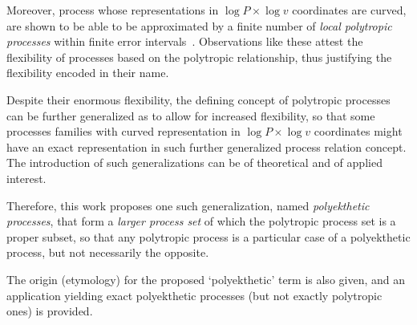     Moreover, process whose representations in $\log P \times \log v$  coordinates  are  curved,
    are shown to be able to be  approximated  by  a  finite  number  of  \emph{local  polytropic
    processes} within  finite  error  intervals~\cite{2020-NaaktgeborenC-engrXiv}.  Observations
    like these attest the flexibility of processes based on the  polytropic  relationship,  thus
    justifying the flexibility encoded in their name.

    Despite their enormous flexibility, the defining concept  of  polytropic  processes  can  be
    further generalized as to allow for increased flexibility, so that some  processes  families
    with curved representation in $\log P  \times  \log  v$  coordinates  might  have  an  exact
    representation in such further generalized process relation  concept.  The  introduction  of
    such generalizations can be of theoretical and of applied interest.

    Therefore, this work proposes one such generalization, named \emph{polyekthetic  processes},
    that form a \emph{larger process set} of which  the  polytropic  process  set  is  a  proper
    subset, so that any polytropic process is a particular case of a polyekthetic  process,  but
    not necessarily the opposite.

    The origin  (etymology)  for  the  proposed  `polyekthetic'  term  is  also  given,  and  an
    application yielding exact polyekthetic processes  (but  not  exactly  polytropic  ones)  is
    provided.


